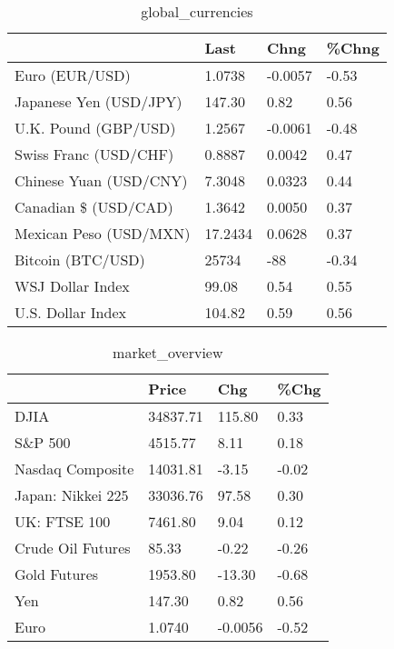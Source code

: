 \documentclass{article}%
\begin{document}
%


\begin{table}[htbp]%
\caption{global\_currencies}%
\centering%
\begin{adjustbox}{width=1\textwidth}%
\begin{tabular}{llll}
\toprule
                       &    Last &    Chng & \%Chng \\
\midrule
        Euro (EUR/USD) &  1.0738 & -0.0057 & -0.53 \\
Japanese Yen (USD/JPY) &  147.30 &    0.82 &  0.56 \\
  U.K. Pound (GBP/USD) &  1.2567 & -0.0061 & -0.48 \\
 Swiss Franc (USD/CHF) &  0.8887 &  0.0042 &  0.47 \\
Chinese Yuan (USD/CNY) &  7.3048 &  0.0323 &  0.44 \\
  Canadian \$ (USD/CAD) &  1.3642 &  0.0050 &  0.37 \\
Mexican Peso (USD/MXN) & 17.2434 &  0.0628 &  0.37 \\
     Bitcoin (BTC/USD) &   25734 &     -88 & -0.34 \\
      WSJ Dollar Index &   99.08 &    0.54 &  0.55 \\
     U.S. Dollar Index &  104.82 &    0.59 &  0.56 \\
\bottomrule
\end{tabular}
%
\end{adjustbox}%
\end{table}

%


\begin{table}[htbp]%
\caption{market\_overview}%
\centering%
\begin{adjustbox}{width=1\textwidth}%
\begin{tabular}{llll}
\toprule
                  &    Price &     Chg &  \%Chg \\
\midrule
             DJIA & 34837.71 &  115.80 &  0.33 \\
          S\&P 500 &  4515.77 &    8.11 &  0.18 \\
 Nasdaq Composite & 14031.81 &   -3.15 & -0.02 \\
Japan: Nikkei 225 & 33036.76 &   97.58 &  0.30 \\
     UK: FTSE 100 &  7461.80 &    9.04 &  0.12 \\
Crude Oil Futures &    85.33 &   -0.22 & -0.26 \\
     Gold Futures &  1953.80 &  -13.30 & -0.68 \\
              Yen &   147.30 &    0.82 &  0.56 \\
             Euro &   1.0740 & -0.0056 & -0.52 \\
\bottomrule
\end{tabular}
%
\end{adjustbox}%
\end{table}

%
\end{document}
